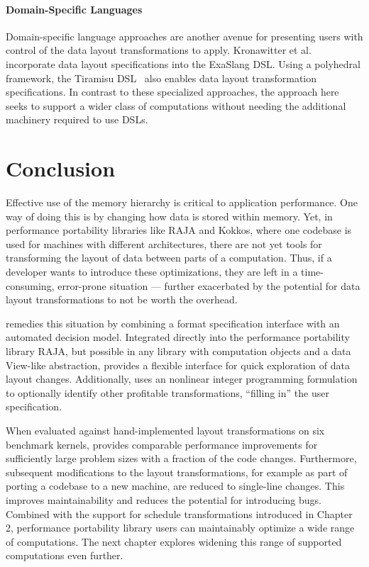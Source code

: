 \paragraph{Domain-Specific Languages}
Domain-specific language approaches are another avenue for presenting users with control of the data layout transformations to apply. 
Kronawitter et al.~\cite{kronawitter2018automatic} incorporate data layout specifications into the ExaSlang DSL.
Using a polyhedral framework, the Tiramisu DSL~\cite{baghdadi2019tiramisu} also enables data layout transformation specifications.
In contrast to these specialized approaches, the approach here seeks to support a wider class of computations without needing the additional machinery required to use DSLs. 


\section{Conclusion}

Effective use of the memory hierarchy is critical to application performance.
One way of doing this is by changing how data is stored within memory.
Yet, in performance portability libraries like RAJA and Kokkos, where one codebase is used for machines with different architectures, there are not yet tools for transforming the layout of data between parts of a computation. 
Thus, if a developer wants to introduce these optimizations, they are left in a time-consuming, error-prone situation --- further exacerbated by the potential for data layout transformations to not be worth the overhead.

\FormatDecisions{} remedies this situation by combining a format specification interface with an automated decision model.
Integrated directly into the performance portability library RAJA, but possible in any library with computation objects and a data View-like abstraction, \FormatDecisions{} provides a flexible interface for quick exploration of data layout changes. 
Additionally, \FormatDecisions{} uses an nonlinear integer programming formulation to optionally identify other profitable transformations, \enquote{filling in} the user specification.

When evaluated against hand-implemented layout transformations on six benchmark kernels, \FormatDecisions{} provides comparable performance improvements for sufficiently large problem sizes with a fraction of the code changes.
Furthermore, subsequent modifications to the layout transformations, for example as part of porting a codebase to a new machine, are reduced to single-line changes. 
This improves maintainability and reduces the potential for introducing bugs.
Combined with the support for schedule transformations introduced in Chapter 2, performance portability library users can maintainably optimize a wide range of computations. 
The next chapter explores widening this range of supported computations even further.
